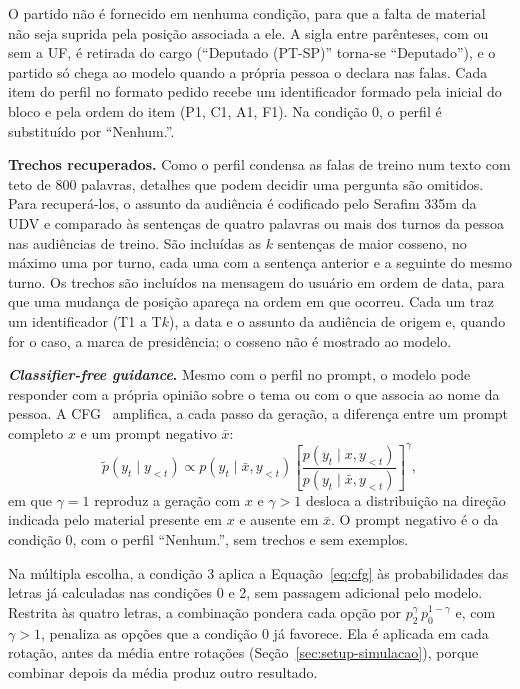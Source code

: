 O partido não é fornecido em nenhuma condição, para que a falta de material não seja suprida pela
posição associada a ele. A sigla entre parênteses, com ou sem a UF, é retirada do cargo (``Deputado
(PT-SP)'' torna-se ``Deputado''), e o partido só chega ao modelo quando a própria pessoa o declara
nas falas. Cada item do perfil no formato pedido recebe um identificador formado pela inicial do
bloco e pela ordem do item (P1, C1, A1, F1). Na condição 0, o perfil é substituído por ``Nenhum.''.

\textbf{Trechos recuperados.} Como o perfil condensa as falas de treino num texto com teto de 800
palavras, detalhes que podem decidir uma pergunta são omitidos. Para recuperá-los, o assunto da
audiência é codificado pelo Serafim 335m da UDV e comparado às sentenças de quatro palavras ou mais
dos turnos da pessoa nas audiências de treino. São incluídas as $k$ sentenças de maior cosseno, no
máximo uma por turno, cada uma com a sentença anterior e a seguinte do mesmo turno. Os trechos são
incluídos na mensagem do usuário em ordem de data, para que uma mudança de posição apareça na ordem
em que ocorreu. Cada um traz um identificador (T1 a T$k$), a data e o assunto da audiência de origem
e, quando for o caso, a marca de presidência; o cosseno não é mostrado ao modelo.

\textbf{\textit{Classifier-free guidance}.} Mesmo com o perfil no prompt, o modelo pode responder com a
própria opinião sobre o tema ou com o que associa ao nome da pessoa. A
CFG~\citep{ho2022classifier,sanchez2024stay} amplifica, a cada passo da geração, a diferença entre um
prompt completo $x$ e um prompt negativo $\bar{x}$:
\begin{equation}
  \tilde{p}(y_t \mid y_{<t}) \propto p(y_t \mid \bar{x}, y_{<t})
  \left[ \frac{p(y_t \mid x, y_{<t})}{p(y_t \mid \bar{x}, y_{<t})} \right]^{\gamma},
  \label{eq:cfg}
\end{equation}
em que $\gamma = 1$ reproduz a geração com $x$ e $\gamma > 1$ desloca a distribuição na direção
indicada pelo material presente em $x$ e ausente em $\bar{x}$. O prompt negativo é o da condição 0,
com o perfil ``Nenhum.'', sem trechos e sem exemplos.

Na múltipla escolha, a condição 3 aplica a Equação~\ref{eq:cfg} às probabilidades das letras já
calculadas nas condições 0 e 2, sem passagem adicional pelo modelo. Restrita às quatro letras, a
combinação pondera cada opção por $p_2^{\gamma}\, p_0^{1-\gamma}$ e, com $\gamma > 1$, penaliza as
opções que a condição 0 já favorece. Ela é aplicada em cada rotação, antes da média entre rotações
(Seção~\ref{sec:setup-simulacao}), porque combinar depois da média produz outro resultado.

